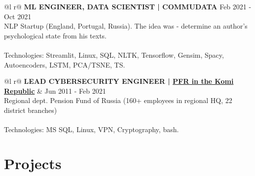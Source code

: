 \documentclass[a4paper,12pt]{article}
\begin{document}
\begin{tabularx}{\linewidth}{ @{}l r@{} }
\textbf{ML ENGINEER, DATA SCIENTIST | COMMUDATA}    \hfill \hspace{90pt} Feb 2021 - Oct 2021\\[3.75pt]
\footnotesize NLP Startup (England, Portugal, Russia). The idea was - determine an author's psychological state from his texts.\\
 \\
\footnotesize Technologies: Streamlit, Linux, SQL, NLTK, Tensorflow, Gensim, Spacy, Autoencoders, LSTM, PCA/TSNE, TS.\\
\end{tabularx}


\begin{tabularx}{\linewidth}{ @{}l r@{} }
\textbf{LEAD CYBERSECURITY ENGINEER | \href{www.pfrf.ru}{PFR in the Komi Republic}}  & \hfill Jun 2011 - Feb 2021 \\
\footnotesize Regional dept. Pension Fund of Russia (160+ employees in regional HQ, 22 district branches)\\
\\
\footnotesize Technologies: MS SQL, Linux, VPN, Cryptography, bash.\\
\end{tabularx}


\section{Projects}
\end{document}
